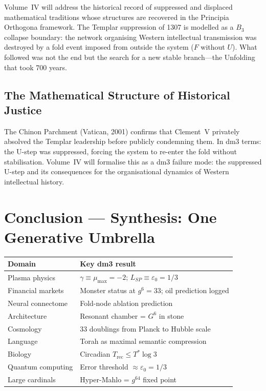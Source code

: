 \documentclass[11pt, twoside, openright]{book}
\theoremstyle{plain}
\theoremstyle{definition}
\newcommand{\eps}{\varepsilon_0}
\begin{document}
Volume~IV will address the historical record of suppressed and displaced
mathematical traditions whose structures are recovered in the Principia
Orthogona framework. The Templar suppression of 1307 is modelled as a
$B_3$ collapse boundary: the network organising Western intellectual
transmission was destroyed by a fold event imposed from outside the
system ($F$ without $U$). What followed was not the end but the search
for a new stable branch---the Unfolding that took 700 years.

\section{The Mathematical Structure of Historical Justice}

The Chinon Parchment (Vatican, 2001) confirms that Clement~V privately
absolved the Templar leadership before publicly condemning them.
In dm3 terms: the U-step was suppressed, forcing the system to re-enter
the fold without stabilisation. Volume~IV will formalise this as a dm3
failure mode: the suppressed U-step and its consequences for the
organisational dynamics of Western intellectual history.

\chapter{Conclusion --- Synthesis: One Generative Umbrella}

\begin{center}
\begin{tabularx}{0.9\textwidth}{@{}P{3.5cm}L@{}}
\toprule
\textbf{Domain} & \textbf{Key dm3 result} \\
\midrule
Plasma physics    & $\gamma \equiv \mu_{\max} = -2$; $L_{SP} \equiv \eps = 1/3$ \\
Financial markets & Monster status at $g^6 = 33$; oil prediction logged \\
Neural connectome & Fold-node ablation prediction \\
Architecture      & Resonant chamber = $G^6$ in stone \\
Cosmology         & 33 doublings from Planck to Hubble scale \\
Language          & Torah as maximal semantic compression \\
Biology           & Circadian $T_{\mathrm{rec}} \le T^* \log 3$ \\
Quantum computing & Error threshold $\approx \eps = 1/3$ \\
Large cardinals   & Hyper-Mahlo = $g^{64}$ fixed point \\
\bottomrule
\end{tabularx}
\end{center}
\end{document}
